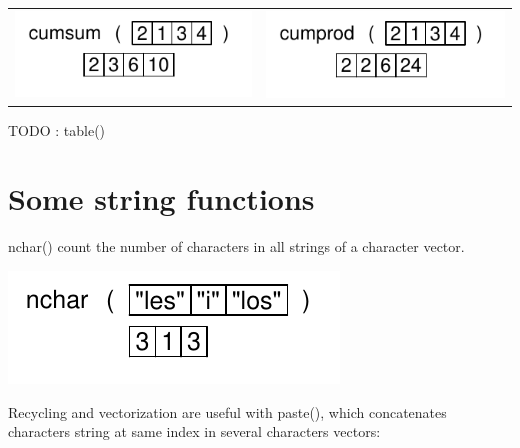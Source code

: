 \documentclass[pdflatex]{article}
\begin{document}
\begin{tabular}{cc}
\includegraphics{cumsum} & \includegraphics{cumprod}
\end{tabular}


TODO : table()

\section{Some string functions}

nchar() count the number of characters in all strings of a character vector.

\includegraphics{nchar}

Recycling and vectorization are useful with paste(), which concatenates characters string at same index in several characters vectors:
\end{document}
